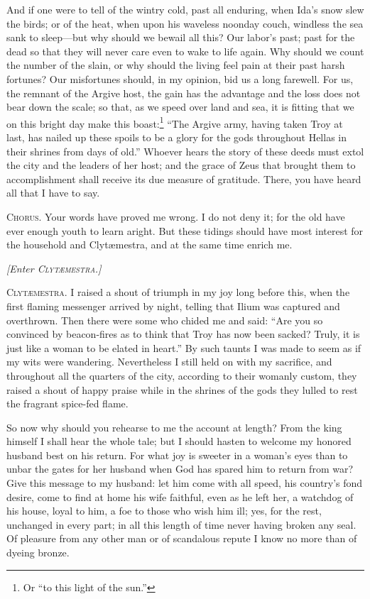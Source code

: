 \documentclass[12pt]{article}
\begin{document}
And if one were to tell of the wintry cold, past all enduring, when Ida's snow slew the birds; or of the heat, when upon his waveless noonday couch, windless the sea sank to sleep---but why should we bewail all this? Our labor's past; past for the dead so that they will never care even to wake to life again. Why should we count the number of the slain, or why should the living feel pain at their past harsh fortunes? Our misfortunes should, in my opinion, bid us a long farewell. For us, the remnant of the Argive host, the gain has the advantage and the loss does not bear down the scale; so that, as we speed over land and sea, it is fitting that we on this bright day make this boast:\footnote{Or ``to this light of the sun.''} ``The Argive army, having taken Troy at last, has nailed up these spoils to be a glory for the gods throughout Hellas in their shrines from days of old.'' Whoever hears the story of these deeds must extol the city and the leaders of her host; and the grace of Zeus that brought them to accomplishment shall receive its due measure of gratitude. There, you have heard all that I have to say.

\textsc{Chorus.} Your words have proved me wrong. I do not deny it; for the old have ever enough youth to learn aright. But these tidings should have most interest for the household and Clyt{\ae}mestra, and at the same time enrich me.

\begin{center}
\textit{[Enter \textsc{Clyt{\ae}mestra.}]}
\end{center}

\textsc{Clyt{\ae}mestra.} I raised a shout of triumph in my joy long before this, when the first flaming messenger arrived by night, telling that Ilium was captured and overthrown. Then there were some who chided me and said: ``Are you so convinced by beacon-fires as to think that Troy has now been sacked? Truly, it is just like a woman to be elated in heart.'' By such taunts I was made to seem as if my wits were wandering. Nevertheless I still held on with my sacrifice, and throughout all the quarters of the city, according to their womanly custom, they raised a shout of happy praise while in the shrines of the gods they lulled to rest the fragrant spice-fed flame.

So now why should you rehearse to me the account at length? From the king himself I shall hear the whole tale; but I should hasten to welcome my honored husband best on his return. For what joy is sweeter in a woman's eyes than to unbar the gates for her husband when God has spared him to return from war? Give this message to my husband: let him come with all speed, his country's fond desire, come to find at home his wife faithful, even as he left her, a watchdog of his house, loyal to him, a foe to those who wish him ill; yes, for the rest, unchanged in every part; in all this length of time never having broken any seal. Of pleasure from any other man or of scandalous repute I know no more than of dyeing bronze.
\end{document}
